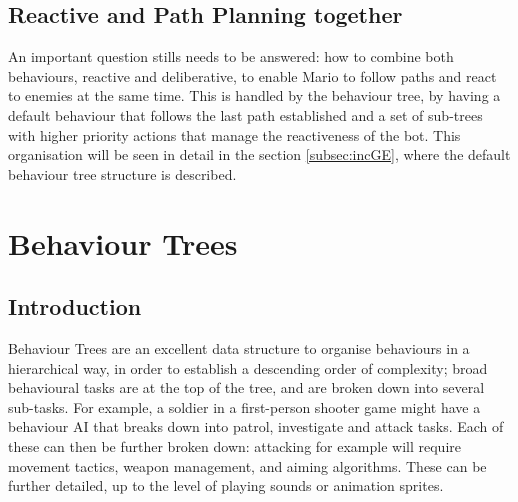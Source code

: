 \documentclass[conference]{IEEEtran}
\begin{document}
\subsection{Reactive and Path Planning together}

An important question stills needs to be answered: how to combine both
behaviours, reactive and deliberative, to enable Mario to follow paths and
react to enemies at the same time. This is handled by the behaviour tree, 
by having a default behaviour that follows the last path established and a 
set of sub-trees with higher priority actions that manage the reactiveness
of the bot. This organisation will be seen in detail in the section \ref{subsec:incGE},
where the default behaviour tree structure is described.

\section{Behaviour Trees}\label{BTs}

\subsection{Introduction}


Behaviour Trees are an excellent data structure to organise behaviours in a hierarchical 
way, in order to establish a descending order of complexity;
broad behavioural tasks are at the top of the tree, and
are broken down into several sub-tasks. For example, a soldier in a
first-person shooter game might have a behaviour AI that breaks down into
patrol, investigate and attack tasks. Each of these can then be further broken
down: attacking for example will require movement tactics, weapon
management, and aiming algorithms. These can be further detailed, up
to the level of playing sounds or animation sprites.

\end{document}
